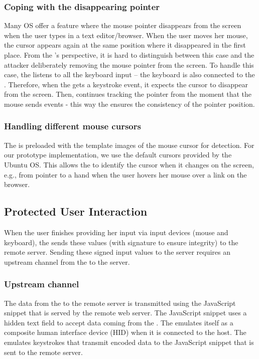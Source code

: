 \subsubsection{\bfseries Coping with the disappearing pointer} Many OS offer a feature where the mouse pointer disappears from the screen when the user types in a text editor/browser. When the user moves her mouse, the cursor appears again at the same position where it disappeared in the first place. From the \device's perspective, it is hard to distinguish between this case and the attacker deliberately removing the mouse pointer from the screen. To handle this case, the \device listens to all the keyboard input -- the keyboard is also connected to the \device. Therefore, when the \device gets a keystroke event, it expects the cursor to disappear from the screen. Then, \device continues tracking the pointer from the moment that the mouse sends events  - this way the \device ensures the consistency of the pointer position.  


\subsubsection{\bfseries Handling different mouse cursors} The \device is preloaded with the template images of the mouse cursor for detection. For our \name prototype implementation, we use the default cursors provided by the Ubuntu OS. This allows the \device to identify the cursor when it changes on the screen, e.g., from pointer to a hand when the user hovers her mouse over a link on the browser. 

 

\subsection{Protected User Interaction}
\label{sec:systemDesign:commit}

When the user finishes providing her input via input devices (mouse and keyboard), the \device sends these values (with signature to ensure integrity) to the remote server. Sending these signed input values to the server requires an upstream channel from the \device to the server.

\subsubsection{\bfseries Upstream channel}\label{sec:systemDesign:commit:upload} The data from the \device to the remote server is transmitted using the \name JavaScript snippet that is served by the remote web server. The \name JavaScript snippet uses a hidden text field to accept data coming from the \device. The \device emulates itself as a composite human interface device (HID) when it is connected to the host. The \device emulates keystrokes that transmit encoded data to the \name JavaScript snippet that is sent to the remote server.

